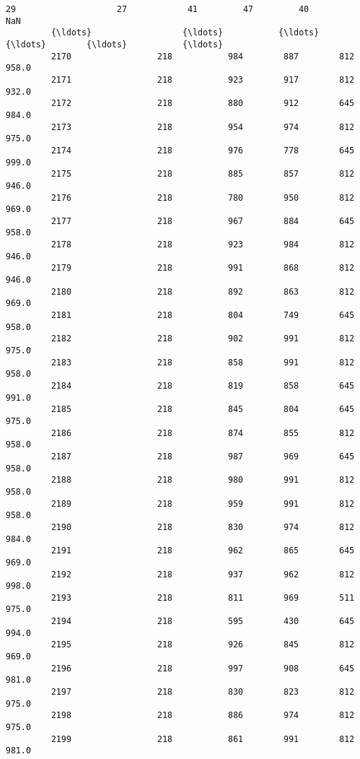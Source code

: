 \documentclass[11pt]{article}
\begin{document}
\begin{Verbatim}[commandchars=\\\{\}]
         29                    27            41         47         40           NaN   
         {\ldots}                  {\ldots}           {\ldots}        {\ldots}        {\ldots}           {\ldots}   
         2170                 218           984        887        812         958.0   
         2171                 218           923        917        812         932.0   
         2172                 218           880        912        645         984.0   
         2173                 218           954        974        812         975.0   
         2174                 218           976        778        645         999.0   
         2175                 218           885        857        812         946.0   
         2176                 218           780        950        812         969.0   
         2177                 218           967        884        645         958.0   
         2178                 218           923        984        812         946.0   
         2179                 218           991        868        812         946.0   
         2180                 218           892        863        812         969.0   
         2181                 218           804        749        645         958.0   
         2182                 218           902        991        812         975.0   
         2183                 218           858        991        812         958.0   
         2184                 218           819        858        645         991.0   
         2185                 218           845        804        645         975.0   
         2186                 218           874        855        812         958.0   
         2187                 218           987        969        645         958.0   
         2188                 218           980        991        812         958.0   
         2189                 218           959        991        812         958.0   
         2190                 218           830        974        812         984.0   
         2191                 218           962        865        645         969.0   
         2192                 218           937        962        812         998.0   
         2193                 218           811        969        511         975.0   
         2194                 218           595        430        645         994.0   
         2195                 218           926        845        812         969.0   
         2196                 218           997        908        645         981.0   
         2197                 218           830        823        812         975.0   
         2198                 218           886        974        812         975.0   
         2199                 218           861        991        812         981.0   
         

\end{Verbatim}
\end{document}
